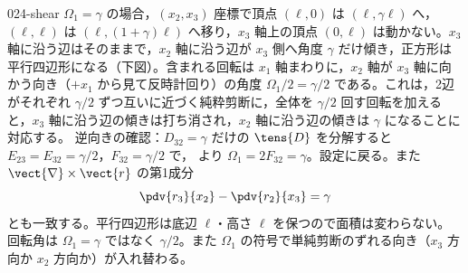 \documentclass[uplatex,dvipdfmx,a4paper,11pt]{jsarticle}
\begin{document}
\begin{kaisetsu}{024-shear}
 $\Omega_1=\gamma$ の場合，$(x_2,x_3)$ 座標で頂点 $(\ell,0)$ は $(\ell,\gamma\ell)$ へ，$(\ell,\ell)$ は $(\ell,(1+\gamma)\ell)$ へ移り，$x_3$ 軸上の頂点 $(0,\ell)$ は動かない。$x_3$ 軸に沿う辺はそのままで，$x_2$ 軸に沿う辺が $x_3$ 側へ角度 $\gamma$ だけ傾き，正方形は平行四辺形になる（下図）。含まれる回転は $x_1$ 軸まわりに，$x_2$ 軸が $x_3$ 軸に向かう向き（$+x_1$ から見て反時計回り）の角度 $\Omega_1/2=\gamma/2$ である。これは，2辺がそれぞれ $\gamma/2$ ずつ互いに近づく純粋剪断に，全体を $\gamma/2$ 回す回転を加えると，$x_3$ 軸に沿う辺の傾きは打ち消され，$x_2$ 軸に沿う辺の傾きは $\gamma$ になることに対応する。
\kenzan 逆向きの確認：$D_{32}=\gamma$ だけの $\tens{D}$ を分解すると $E_{23}=E_{32}=\gamma/2$，$F_{32}=\gamma/2$ で， より $\Omega_1=2F_{32}=\gamma$。設定に戻る。また $\vect{\nabla}\times\vect{r}$ の第1成分
\[ \pdv{r_3}{x_2}-\pdv{r_2}{x_3}=\gamma \]
とも一致する。平行四辺形は底辺 $\ell$・高さ $\ell$ を保つので面積は変わらない。
\tsumazuki 回転角は $\Omega_1=\gamma$ ではなく $\gamma/2$。また $\Omega_1$ の符号で単純剪断のずれる向き（$x_3$ 方向か $x_2$ 方向か）が入れ替わる。
\end{kaisetsu}
\end{document}
